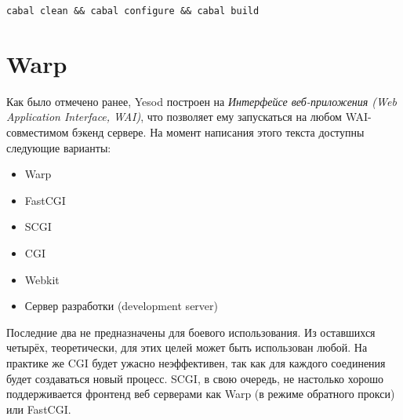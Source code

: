 \begin{lstlisting}
cabal clean && cabal configure && cabal build
\end{lstlisting}

%
\section{Warp}
%
%
%

Как было отмечено ранее, Yesod построен на \emph{Интерфейсе веб-приложения (Web Application Interface, WAI)}, что позволяет ему запускаться на любом WAI-совместимом бэкенд сервере. На момент написания этого текста доступны следующие варианты:
\begin{itemize}
    \item Warp
    \item FastCGI
    \item SCGI
    \item CGI
    \item Webkit
    \item Сервер разработки (development server)
\end{itemize}

%
Последние два не предназначены для боевого %
использования. Из оставшихся четырёх, теоретически, для этих целей может быть использован любой. На практике же CGI будет ужасно неэффективен, так как для каждого соединения будет создаваться новый процесс. SCGI, в свою очередь, не настолько хорошо поддерживается фронтенд веб серверами как Warp (в режиме обратного прокси) или FastCGI.

